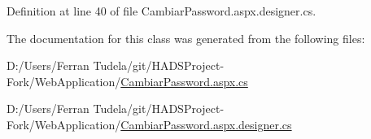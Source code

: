 Definition at line 40 of file Cambiar\+Password.\+aspx.\+designer.\+cs.



The documentation for this class was generated from the following files\+:\begin{DoxyCompactItemize}
\item 
D\+:/\+Users/\+Ferran Tudela/git/\+H\+A\+D\+S\+Project-\/\+Fork/\+Web\+Application/\mbox{\hyperlink{CambiarPassword_8aspx_8cs}{Cambiar\+Password.\+aspx.\+cs}}\item 
D\+:/\+Users/\+Ferran Tudela/git/\+H\+A\+D\+S\+Project-\/\+Fork/\+Web\+Application/\mbox{\hyperlink{CambiarPassword_8aspx_8designer_8cs}{Cambiar\+Password.\+aspx.\+designer.\+cs}}\end{DoxyCompactItemize}

